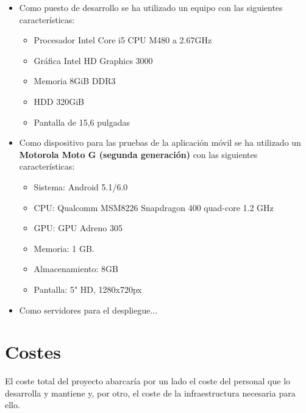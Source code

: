 \begin{itemize}
\item Como puesto de desarrollo se ha utilizado un equipo con las siguientes
  características:
  \begin{itemize}
  \item Procesador Intel Core i5 CPU M480 a 2.67GHz
  \item Gráfica Intel HD Graphics 3000
  \item Memoria 8GiB DDR3
  \item HDD 320GiB
  \item Pantalla de 15,6 pulgadas
  \end{itemize}

\item Como dispositivo para las pruebas de la aplicación móvil se ha utilizado
  un \textbf{Motorola Moto G (segunda generación)} con las siguientes
  características:

  \begin{itemize}
  \item Sistema: Android 5.1/6.0
  \item CPU: Qualcomm MSM8226 Snapdragon 400 quad-core 1.2 GHz
  \item GPU: GPU Adreno 305
  \item Memoria: 1 GB.
  \item Almacenamiento: 8GB
  \item Pantalla: 5" HD, 1280x720px
  \end{itemize}

\item Como servidores para el despliegue...
  
\end{itemize}


\section{Costes}

El coste total del proyecto abarcaría por un lado el coste del personal que
lo desarrolla y mantiene y, por otro, el coste de la infraestructura necesaria
para ello.

